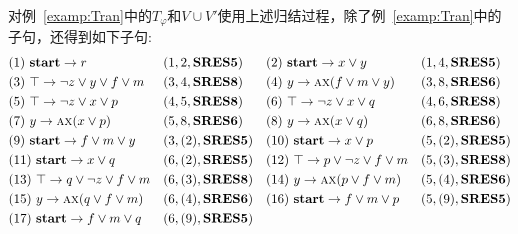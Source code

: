 \begin{example}\label{examp:Res}
	对例~\ref{examp:Tran}中的$T_{\varphi}$和$V\cup V'$使用上述归结过程，除了例~\ref{examp:Tran}中的子句，还得到如下子句:
	\begin{align*}
		&(1)\ \textbf{start} \rightarrow r && (1,2,\textbf{SRES5})
		&&(2)\ \textbf{start} \rightarrow x \vee y && (1,4,\textbf{SRES5})\\
		&(3)\ \top \rightarrow \neg z \vee y \vee f \vee m && (3, 4, \textbf{SRES8})
		&&(4)\ y \rightarrow \textsc{a}\textsc{x}(f\vee m\vee y) && (3,8, \textbf{SRES6})\\
		&(5)\ \top \rightarrow \neg z \vee x \vee p && (4,5, \textbf{SRES8})
		&&(6)\ \top \rightarrow \neg z \vee x \vee q && (4,6, \textbf{SRES8})\\
		&(7)\ y \rightarrow \textsc{a}\textsc{x}(x\vee p) && (5, 8, \textbf{SRES6})
		&&(8)\ y \rightarrow \textsc{a}\textsc{x}(x\vee q) && (6, 8, \textbf{SRES6})\\
		&(9)\ \textbf{start} \rightarrow f\vee m \vee y && (3,(2), \textbf{SRES5}) 
		&&(10)\ \textbf{start} \rightarrow x \vee p && (5,(2),\textbf{SRES5}) \\
		&(11)\ \textbf{start} \rightarrow x \vee q && (6,(2), \textbf{SRES5})
		&& (12)\ \top \rightarrow p \vee \neg z \vee f \vee m && (5,(3), \textbf{SRES8})\\
		& (13)\ \top \rightarrow q \vee \neg z \vee f \vee m && (6,(3), \textbf{SRES8})
		&&(14)\ y \rightarrow \textsc{a}\textsc{x}(p \vee f\vee m) && (5, (4), \textbf{SRES6})\\
		&(15)\ y \rightarrow \textsc{a}\textsc{x}(q \vee f\vee m) && (6, (4), \textbf{SRES6}) 
		&&(16)\ \textbf{start} \rightarrow f\vee m \vee p && (5, (9), \textbf{SRES5}) \\
		&(17)\ \textbf{start} \rightarrow f\vee m \vee q && (6, (9), \textbf{SRES5})
	\end{align*}
\end{example}



